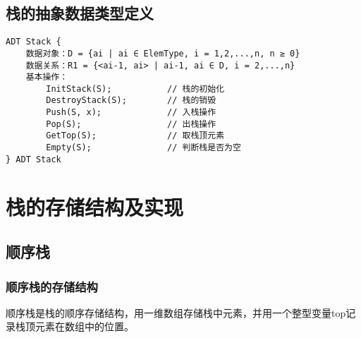 \documentclass[12pt,a4paper]{amsart}
\begin{document}
\subsection{栈的抽象数据类型定义}

\indent

\begin{lstlisting}[caption=栈的抽象数据类型定义]
ADT Stack {
    数据对象：D = {ai | ai ∈ ElemType, i = 1,2,...,n, n ≥ 0}
    数据关系：R1 = {<ai-1, ai> | ai-1, ai ∈ D, i = 2,...,n}
    基本操作：
        InitStack(S);           // 栈的初始化
        DestroyStack(S);        // 栈的销毁
        Push(S, x);             // 入栈操作
        Pop(S);                 // 出栈操作
        GetTop(S);              // 取栈顶元素
        Empty(S);               // 判断栈是否为空
} ADT Stack
\end{lstlisting}

\section{栈的存储结构及实现}

\subsection{顺序栈}

\subsubsection{顺序栈的存储结构}

顺序栈是栈的顺序存储结构，用一维数组存储栈中元素，并用一个整型变量top记录栈顶元素在数组中的位置。

\begin{center}
\end{center}
\end{document}
